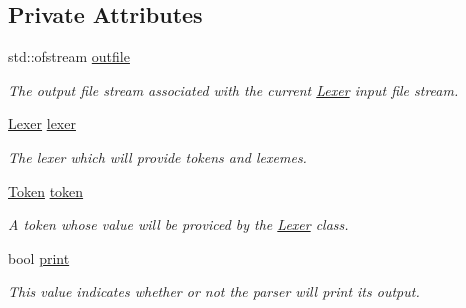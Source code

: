 \subsection*{Private Attributes}
\begin{DoxyCompactItemize}
\item 
\hypertarget{class_parser_aa5fb86beefedf2e8bbefca807fc74bca}{}\label{class_parser_aa5fb86beefedf2e8bbefca807fc74bca} 
std\+::ofstream \hyperlink{class_parser_aa5fb86beefedf2e8bbefca807fc74bca}{outfile}
\begin{DoxyCompactList}\small\item\em The output file stream associated with the current \hyperlink{class_lexer}{Lexer} input file stream. \end{DoxyCompactList}\item 
\hypertarget{class_parser_aad05518621c5340d31f2b986a6467584}{}\label{class_parser_aad05518621c5340d31f2b986a6467584} 
\hyperlink{class_lexer}{Lexer} \hyperlink{class_parser_aad05518621c5340d31f2b986a6467584}{lexer}
\begin{DoxyCompactList}\small\item\em The lexer which will provide tokens and lexemes. \end{DoxyCompactList}\item 
\hypertarget{class_parser_a77945ac7a42745c4655c2cfd0152c891}{}\label{class_parser_a77945ac7a42745c4655c2cfd0152c891} 
\hyperlink{_lexer_8h_a6a9e93b081bad7fc74c17306fb168c1f}{Token} \hyperlink{class_parser_a77945ac7a42745c4655c2cfd0152c891}{token}
\begin{DoxyCompactList}\small\item\em A token whose value will be proviced by the \hyperlink{class_lexer}{Lexer} class. \end{DoxyCompactList}\item 
\hypertarget{class_parser_a127bec7e69bb49eadf9f935bd680fb6c}{}\label{class_parser_a127bec7e69bb49eadf9f935bd680fb6c} 
bool \hyperlink{class_parser_a127bec7e69bb49eadf9f935bd680fb6c}{print}
\begin{DoxyCompactList}\small\item\em This value indicates whether or not the parser will print its output. \end{DoxyCompactList}\end{DoxyCompactItemize}



